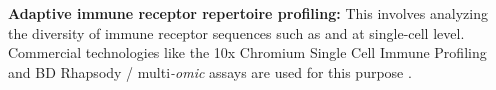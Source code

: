 


\textbf{Adaptive immune receptor repertoire profiling: }This involves analyzing the diversity of immune receptor sequences such as  and  at single-cell level. Commercial technologies like the 10x Chromium Single Cell Immune Profiling and BD Rhapsody / multi\textit{-omic} assays are used for this purpose \textbf{\cite{heumos_best_2023}}. 

